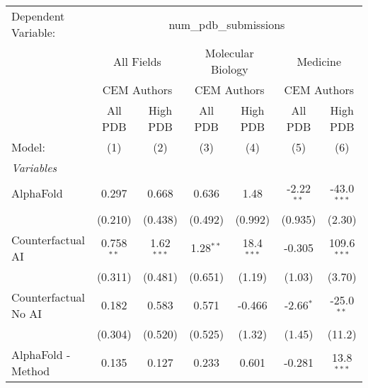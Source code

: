 \begingroup
\centering
\begin{tabular}{lcccccc}
   \tabularnewline \midrule \midrule
   Dependent Variable: & \multicolumn{6}{c}{num\_pdb\_submissions}\\
 & \multicolumn{2}{c}{All Fields} & \multicolumn{2}{c}{Molecular Biology} & \multicolumn{2}{c}{Medicine} \\
\cmidrule(lr){2-3} \cmidrule(lr){4-5} \cmidrule(lr){6-7}
 & \multicolumn{2}{c}{CEM Authors} & \multicolumn{2}{c}{CEM Authors} & \multicolumn{2}{c}{CEM Authors} \\
\cmidrule(lr){2-3} \cmidrule(lr){4-5} \cmidrule(lr){6-7}
 & \multicolumn{1}{c}{All PDB} & \multicolumn{1}{c}{High PDB} & \multicolumn{1}{c}{All PDB} & \multicolumn{1}{c}{High PDB} & \multicolumn{1}{c}{All PDB} & \multicolumn{1}{c}{High PDB} \\
\cmidrule(lr){2-2} \cmidrule(lr){3-3} \cmidrule(lr){4-4} \cmidrule(lr){5-5} \cmidrule(lr){6-6} \cmidrule(lr){7-7}
   Model:                                                     & (1)          & (2)           & (3)          & (4)           & (5)          & (6)\\  
   \midrule
   \emph{Variables}\\
   AlphaFold                                                  & 0.297        & 0.668         & 0.636        & 1.48          & -2.22$^{**}$ & -43.0$^{***}$\\   
                                                              & (0.210)      & (0.438)       & (0.492)      & (0.992)       & (0.935)      & (2.30)\\   
   Counterfactual AI                                          & 0.758$^{**}$ & 1.62$^{***}$  & 1.28$^{**}$  & 18.4$^{***}$  & -0.305       & 109.6$^{***}$\\   
                                                              & (0.311)      & (0.481)       & (0.651)      & (1.19)        & (1.03)       & (3.70)\\   
   Counterfactual No AI                                       & 0.182        & 0.583         & 0.571        & -0.466        & -2.66$^{*}$  & -25.0$^{**}$\\   
                                                              & (0.304)      & (0.520)       & (0.525)      & (1.32)        & (1.45)       & (11.2)\\   
   AlphaFold - Method                                         & 0.135        & 0.127         & 0.233        & 0.601         & -0.281       & 13.8$^{***}$\\   

\end{tabular}
